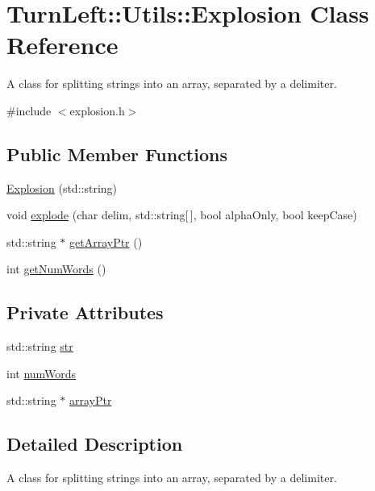 \hypertarget{classTurnLeft_1_1Utils_1_1Explosion}{
\section{TurnLeft::Utils::Explosion Class Reference}
\label{classTurnLeft_1_1Utils_1_1Explosion}
}


A class for splitting strings into an array, separated by a delimiter.  




{\ttfamily \#include $<$explosion.h$>$}

\subsection*{Public Member Functions}
\begin{DoxyCompactItemize}
\item 
\hyperlink{classTurnLeft_1_1Utils_1_1Explosion_aa8e82cc3a2c0db540b429eb019e21e86}{Explosion} (std::string)
\item 
void \hyperlink{classTurnLeft_1_1Utils_1_1Explosion_ac517370d7a669bed21806f93211f588a}{explode} (char delim, std::string\mbox{[}$\,$\mbox{]}, bool alphaOnly, bool keepCase)
\item 
std::string $\ast$ \hyperlink{classTurnLeft_1_1Utils_1_1Explosion_ac0bb44dc711f42ae5b3ccd48ae41d562}{getArrayPtr} ()
\item 
int \hyperlink{classTurnLeft_1_1Utils_1_1Explosion_ad90d3a30cf6de4ca5c115bd7a6937727}{getNumWords} ()
\end{DoxyCompactItemize}
\subsection*{Private Attributes}
\begin{DoxyCompactItemize}
\item 
std::string \hyperlink{classTurnLeft_1_1Utils_1_1Explosion_ab45811e6b3a745ff8bf0bc0685820348}{str}
\item 
int \hyperlink{classTurnLeft_1_1Utils_1_1Explosion_a918953ec29dc35a398bbf85bf0db5c8d}{numWords}
\item 
std::string $\ast$ \hyperlink{classTurnLeft_1_1Utils_1_1Explosion_a56af88f749fdb6c519241f887caa03fa}{arrayPtr}
\end{DoxyCompactItemize}


\subsection{Detailed Description}
A class for splitting strings into an array, separated by a delimiter. 

